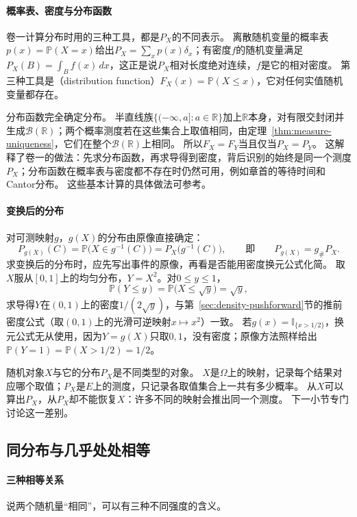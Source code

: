 \paragraph{概率表、密度与分布函数}
卷一计算分布时用的三种工具，都是$P_X$的不同表示。
离散随机变量的概率表$p(x)=\mathbb P(X=x)$给出$P_X=\sum_xp(x)\delta_x$；有密度$f$的随机变量满足$P_X(B)=\int_Bf(x)\,dx$，这正是说$P_X$相对长度绝对连续，$f$是它的相对密度。
第三种工具是（distribution function）$F_X(x)=\mathbb P(X\le x)$，它对任何实值随机变量都存在。

分布函数完全确定分布。
半直线族$\{(-\infty,a]:a\in\mathbb R\}$加上$\mathbb R$本身，对有限交封闭并生成$\mathcal B(\mathbb R)$；两个概率测度若在这些集合上取值相同，由定理~\ref{thm:measure-uniqueness}，它们在整个$\mathcal B(\mathbb R)$上相同。
所以$F_X=F_Y$当且仅当$P_X=P_Y$。
这解释了卷一的做法：先求分布函数，再求导得到密度，背后识别的始终是同一个测度$P_X$；分布函数在概率表与密度都不存在时仍然可用，例如章首的等待时间和Cantor分布。
这些基本计算的具体做法可参考。

\paragraph{变换后的分布}
对可测映射$g$，$g(X)$的分布由原像直接确定：
\[
  P_{g(X)}(C)=\mathbb P\bigl(X\in g^{-1}(C)\bigr)=P_X\bigl(g^{-1}(C)\bigr),
  \qquad\text{即}\qquad P_{g(X)}=g_\#P_X.
\]
求变换后的分布时，应先写出事件的原像，再看是否能用密度换元公式化简。
取$X$服从$[0,1]$上的均匀分布，$Y=X^2$。对$0\le y\le1$，
\[
  \mathbb P(Y\le y)=\mathbb P\bigl(X\le\sqrt y\bigr)=\sqrt y,
\]
求导得$Y$在$(0,1)$上的密度$1/(2\sqrt y)$，与第~\ref{sec:density-pushforward}节的推前密度公式（取$(0,1)$上的光滑可逆映射$x\mapsto x^2$）一致。
若$g(x)=\mathbb I_{\{x>1/2\}}$，换元公式无从使用，因为$Y=g(X)$只取$0,1$，没有密度；原像方法照样给出$\mathbb P(Y=1)=\mathbb P(X>1/2)=1/2$。

随机对象$X$与它的分布$P_X$是不同类型的对象。
$X$是$\Omega$上的映射，记录每个结果对应哪个取值；$P_X$是$E$上的测度，只记录各取值集合上一共有多少概率。
从$X$可以算出$P_X$，从$P_X$却不能恢复$X$：许多不同的映射会推出同一个测度。
下一小节专门讨论这一差别。

\subsection{同分布与几乎处处相等}

\paragraph{三种相等关系}
说两个随机量“相同”，可以有三种不同强度的含义。

